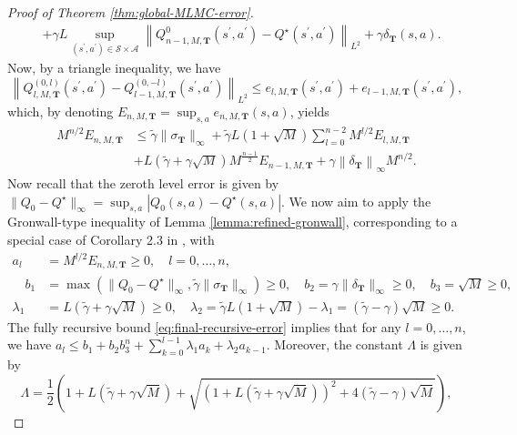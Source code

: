 \documentclass[11pt]{article}
\numberwithin{equation}{section}
\theoremstyle{definition}
\theoremstyle{remark}
\newcommand{\citet}{\cite}
\begin{document}
\begin{proof}[Proof of Theorem \ref{thm:global-MLMC-error}]
\begin{equation*}
\begin{aligned}
                                   & + \gamma L \sup_{(s^\prime,a^\prime) \in \mathcal S \times \mathcal A}\left\|Q^0_{n-1,M,\mathbf T} (s^\prime, a^\prime) - Q^\star (s^\prime, a^\prime) \right\|_{L^2} + \gamma \delta_{\mathbf T}(s,a).
        \end{aligned}
    \end{equation*}
    Now, by a triangle inequality, we have
    \[
        \left\| Q_{l,M,\mathbf T} ^{(0,l)}(s^\prime,a^\prime) - Q_{l-1,M,\mathbf T} ^{(0,-l)}(s^\prime,a^\prime)\right\|_{L^2} \leq e_{l,M,\mathbf T}(s^\prime,a^\prime) + e_{l-1,M,\mathbf T}(s^\prime,a^\prime),
    \]
    which, by denoting $E_{n,M,\mathbf T} = \sup_{s,a} e_{n,M,\mathbf T}(s,a)$, yields
    \begin{equation}
        \label{eq:final-recursive-error}
        \begin{aligned}
        M ^{n / 2} E _{n,M,\mathbf T} &\leq \tilde \gamma \|\sigma _{\mathbf T}\|_{\infty} + \tilde \gamma L (1 + \sqrt{M}) \sum_{l = 0}^{n-2} M ^{l / 2} E _{l,M,\mathbf T} \\
        &+ L(\tilde{\gamma} + \gamma\sqrt{M}) M^{\frac{n-1}{2}} E_{n-1,M,\mathbf T} + \gamma \left \|\delta_{\mathbf T}\right\|_{\infty} M^{n/2}.
        \end{aligned}
    \end{equation}
    Now recall that the zeroth level error is given by $\|Q_0 - Q^\star\|_{\infty} = \sup_{s,a} |Q_0(s,a) - Q^\star(s,a)|$. 
    We now aim to apply the Gronwall-type inequality of Lemma \ref{lemma:refined-gronwall}, corresponding to a special case of Corollary 2.3 in \citet{hutzenthaler2022multilevel}, with
    \[
    \begin{aligned}
    a_l &= M^{l/2} E_{n,M,\mathbf T} \geq 0, \quad l = 0, \ldots, n,  \\
    \quad b_1 &= \max\left( \| Q_0 - Q^\star\|_{\infty},  \tilde{\gamma} \| \sigma_{\mathbf T} \|_{\infty}\right) \geq 0, \quad b_2 = \gamma\| \delta_{\mathbf T} \|_{\infty} \geq 0, \quad b_3 = \sqrt{M} \geq 0,\\
    \lambda_1 &=  L (\tilde {\gamma} + \gamma\sqrt M) \geq 0, \quad \lambda_2 = \tilde{\gamma} L (1 + \sqrt{M}) - \lambda_1 = (\tilde{\gamma} - \gamma) \sqrt M \geq 0. 
    \end{aligned}
    \]
    The fully recursive bound \eqref{eq:final-recursive-error} implies that for any $l = 0, \ldots, n$, we have $a_l \leq b_1 + b_2 b_3^n + \sum_{k = 0}^{l-1} \lambda_1 a_k + \lambda_2 a_{k-1}$. Moreover, the constant $\Lambda$ is given by
    \[
    \Lambda = \frac{1}{2} \left(1 + L(\tilde{\gamma} + \gamma \sqrt{M}) + \sqrt{\left(1 + L(\tilde{\gamma} + \gamma \sqrt{M})\right)^2 + 4 (\tilde{\gamma} - \gamma)\sqrt{M}} \right),
\]
\end{proof}
\end{document}
